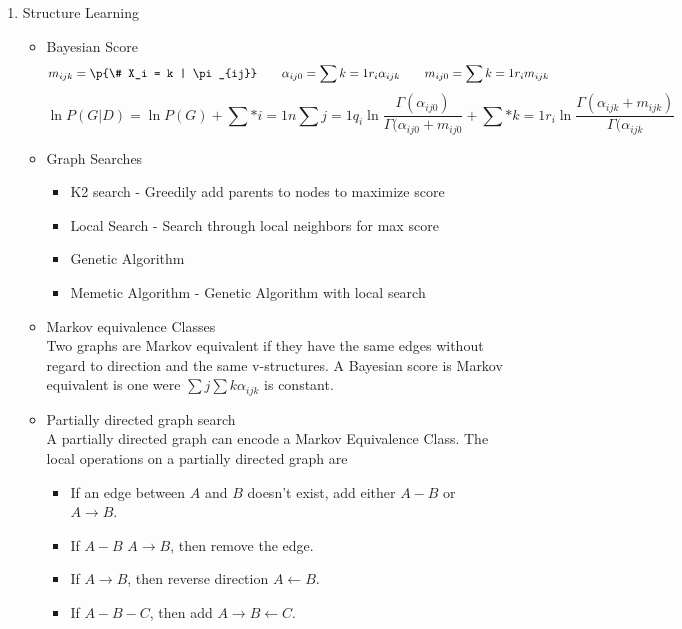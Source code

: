 \documentclass[10pt, oneside]{article}
\begin{document}
\begin{enumerate}
\begin{itemize}
\begin{itemize}
          \end{itemize}
      \end{itemize}

    \item Structure Learning
      \begin{itemize}
        \item Bayesian Score
          \[
            m_{ijk} = \p{\# X_i = k | \pi_{ij}} \qquad \alpha_{ij0} = \sum{k = 1}{r_i}{\alpha_{ijk}} \qquad m_{ij0} = \sum{k = 1}{r_i}{m_{ijk}}
          \]
          \[
            \ln{P(G|D)} = \ln{P(G)} + \sum*{i = 1}{n}{\sum{j = 1}{q_i}{\ln{\frac{\Gamma(\alpha_{ij0})}{\Gamma(\alpha_{ij0} + m_{ij0}}} 
              + \sum*{k = 1}{r_i}{\ln{\frac{\Gamma(\alpha_{ijk} + m_{ijk})}{\Gamma(\alpha_{ijk}}}}}}
          \]

        \item Graph Searches
          \begin{itemize}
              \item K2 search - Greedily add parents to nodes to maximize score
              \item Local Search - Search through local neighbors for max score
              \item Genetic Algorithm
              \item Memetic Algorithm - Genetic Algorithm with local search
          \end{itemize}

        \item Markov equivalence Classes \\
          Two graphs are Markov equivalent if they have the same edges without
          regard to direction and the same v-structures.
          A Bayesian score is Markov equivalent is one were
          $\sum{j}{}{\sum{k}{}{\alpha_{ijk}}}$ is constant.

        \item Partially directed graph search \\
          A partially directed graph can encode a Markov Equivalence Class.
          The local operations on a partially directed graph are
          \begin{itemize}
            \item If an edge between $A$ and $B$ doesn't exist, add either $A-B$ or $A\to B$.
            \item If $A-B$ $A\to B$, then remove the edge.
            \item If $A\to B$, then reverse direction $A\gets B$.
            \item If $A-B-C$, then add $A \to B \gets C$.
          \end{itemize}
      \end{itemize}


  \end{enumerate}
\end{document}
